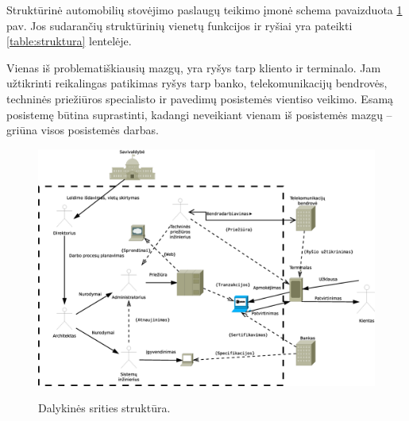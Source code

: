 \documentclass[10pt]{IEEEtran}
\begin{document}
            Struktūrinė automobilių stovėjimo paslaugų teikimo įmonė schema pavaizduota \ref{fig:struktur2a} pav. Jos sudarančių struktūrinių vienetų funkcijos ir ryšiai yra pateikti \ref{table:struktura} lentelėje. 

            Vienas iš problematiškiausių mazgų, yra ryšys tarp kliento ir terminalo. Jam užtikrinti reikalingas patikimas ryšys tarp banko, telekomunikacijų bendrovės, techninės priežiūros specialisto ir pavedimų posistemės vientiso veikimo. Esamą posistemę būtina suprastinti, kadangi neveikiant vienam iš posistemės mazgų -- griūna visos posistemės darbas.

            \begin{figure}[t]
                \centering
                \includegraphics[width=540px]{figures/struktura.eps}
                \label{fig:struktur2a}
                \caption{Dalykinės srities struktūra.}
            \end{figure}
\end{document}
